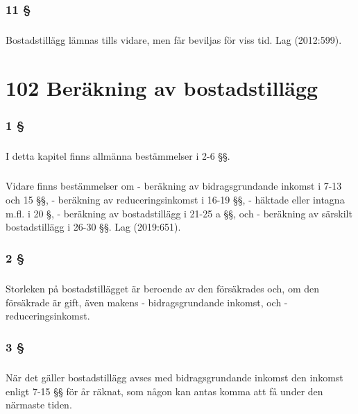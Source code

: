 \documentclass[a4paper,notitlepage,openany,10pt]{book}
\begin{document}
\subsection*{11 §}
\paragraph*{}
Bostadstillägg lämnas tills vidare, men får beviljas för viss tid.
Lag (2012:599).
\chapter*{102 Beräkning av bostadstillägg}
\subsection*{1 §}
\paragraph*{}
I detta kapitel finns allmänna bestämmelser i 2-6 §§.
\paragraph*{}
Vidare finns bestämmelser om
\newline - beräkning av bidragsgrundande inkomst i 7-13 och 15 §§,
\newline - beräkning av reduceringsinkomst i 16-19 §§,
\newline - häktade eller intagna m.fl. i 20 §,
\newline - beräkning av bostadstillägg i 21-25 a §§, och
\newline - beräkning av särskilt bostadstillägg i 26-30 §§.
Lag (2019:651).
\subsection*{2 §}
\paragraph*{}
Storleken på bostadstillägget är beroende av den försäkrades och, om den försäkrade är gift, även makens
\newline - bidragsgrundande inkomst, och
\newline - reduceringsinkomst.
\subsection*{3 §}
\paragraph*{}
När det gäller bostadstillägg avses med bidragsgrundande inkomst den inkomst enligt 7-15 §§ för år räknat, som någon kan antas komma att få under den närmaste tiden.
\end{document}
